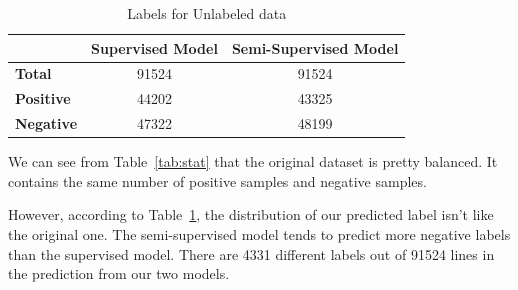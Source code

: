 \begin{table}[ht]  %
\centering  %
\caption{Labels for Unlabeled data}
\begin{tabular}{lcc}
\hline
&    \textbf{Supervised Model} & \textbf{Semi-Supervised Model}  \\
\hline
 \textbf{Total} & 91524 & 91524  \\
 \textbf{Positive}   & 44202 &  43325 \\
 \textbf{Negative} & 47322  &  48199  \\
\hline
\end{tabular}
\label{tab:unlabel}
\end{table}

We can see from Table~\ref{tab:stat} that the original dataset is pretty balanced. It contains the same number of positive samples and negative samples.

However, according to Table~\ref{tab:unlabel}, the distribution of our predicted label isn't like the original one. The semi-supervised model tends to predict more negative labels than the supervised model. There are 4331 different labels out of 91524 lines in the prediction from our two models.








